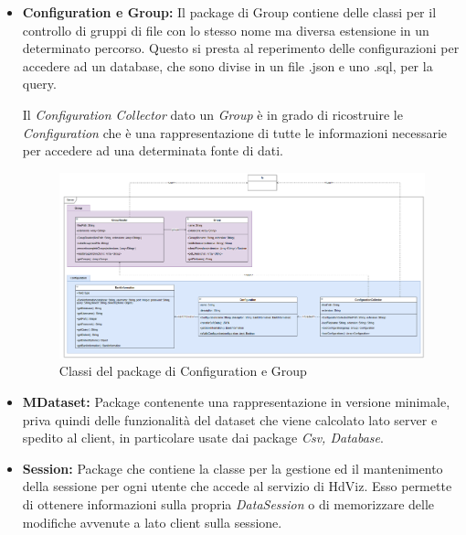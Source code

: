 \documentclass[../manuale_sviluppatore.tex]{subfiles}
\begin{document}
\begin{itemize}
	\newpage
	\item \textbf{Configuration e Group:} Il package di Group contiene delle classi per il controllo di gruppi
	di file con lo stesso nome ma diversa estensione in un determinato percorso. Questo si presta al reperimento delle 
	configurazioni per accedere ad un database, che sono divise in un file .json e uno .sql, per la query. 

	Il \emph{Configuration Collector} dato un \emph{Group} è in grado di ricostruire le \emph{Configuration} che 
	è una rappresentazione di tutte le informazioni necessarie per accedere ad una determinata fonte di dati.
	
	\begin{figure}[H]
		\centering
		\includegraphics[width=18cm]{src/img/server-group.png}
		\caption{Classi del package di Configuration e Group}
	\end{figure}

	\item \textbf{MDataset:} Package contenente una rappresentazione in versione minimale, priva quindi delle funzionalità del dataset
	che viene calcolato lato server e spedito al client, in particolare usate dai package \emph{Csv, Database}.

	\item \textbf{Session:} Package che contiene la classe per la gestione ed il mantenimento della sessione per ogni utente che 
	accede al servizio di HdViz. Esso permette di ottenere informazioni sulla propria \emph{DataSession} o di memorizzare delle 
	modifiche avvenute a lato client sulla sessione.

\end{itemize}
\end{document}

